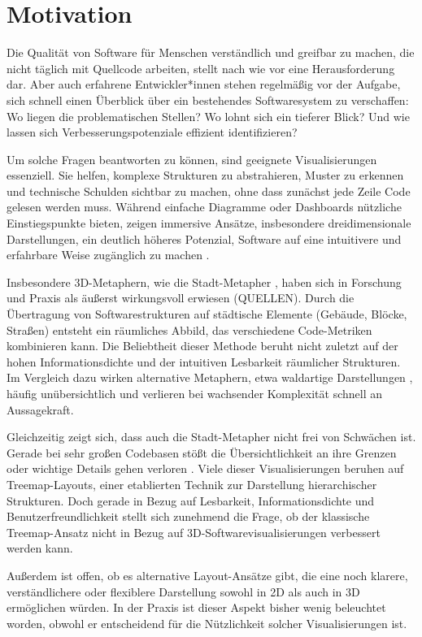 \chapter{Motivation} \label{sec:Motivation}
Die Qualität von Software für Menschen verständlich und greifbar zu machen, die nicht täglich mit Quellcode arbeiten, stellt nach wie vor eine Herausforderung dar. Aber auch erfahrene Entwickler*innen stehen regelmäßig vor der Aufgabe, sich schnell einen Überblick über ein bestehendes Softwaresystem zu verschaffen: Wo liegen die problematischen Stellen? Wo lohnt sich ein tieferer Blick? Und wie lassen sich Verbesserungspotenziale effizient identifizieren?

Um solche Fragen beantworten zu können, sind geeignete Visualisierungen essenziell. Sie helfen, komplexe Strukturen zu abstrahieren, Muster zu erkennen und technische Schulden sichtbar zu machen, ohne dass zunächst jede Zeile Code gelesen werden muss. Während einfache Diagramme oder Dashboards nützliche Einstiegspunkte bieten, zeigen immersive Ansätze, insbesondere dreidimensionale Darstellungen, ein deutlich höheres Potenzial, Software auf eine intuitivere und erfahrbare Weise zugänglich zu machen \cite{3dsoftwareMarcus,codeCity1,first_3D_vis,virtualButVisibleMunro}.

Insbesondere 3D-Metaphern, wie die Stadt-Metapher \cite{codeCity1}, haben sich in Forschung und Praxis als äußerst wirkungsvoll erwiesen (QUELLEN). Durch die Übertragung von Softwarestrukturen auf städtische Elemente (Gebäude, Blöcke, Straßen) entsteht ein räumliches Abbild, das verschiedene Code-Metriken kombinieren kann. Die Beliebtheit dieser Methode beruht nicht zuletzt auf der hohen Informationsdichte und der intuitiven Lesbarkeit räumlicher Strukturen. Im Vergleich dazu wirken alternative Metaphern, etwa waldartige Darstellungen \cite{softwareForest}, häufig unübersichtlich und verlieren bei wachsender Komplexität schnell an Aussagekraft.

Gleichzeitig zeigt sich, dass auch die Stadt-Metapher nicht frei von Schwächen ist. Gerade bei sehr großen Codebasen stößt die Übersichtlichkeit an ihre Grenzen oder wichtige Details gehen verloren \cite{lu2008cascaded}. Viele dieser Visualisierungen beruhen auf Treemap-Layouts, einer etablierten Technik zur Darstellung hierarchischer Strukturen. Doch gerade in Bezug auf Lesbarkeit, Informationsdichte und Benutzerfreundlichkeit stellt sich zunehmend die Frage, ob der klassische Treemap-Ansatz nicht in Bezug auf 3D-Softwarevisualisierungen verbessert werden kann.

Außerdem ist offen, ob es alternative Layout-Ansätze gibt, die eine noch klarere, verständlichere oder flexiblere Darstellung sowohl in 2D als auch in 3D ermöglichen würden. In der Praxis ist dieser Aspekt bisher wenig beleuchtet worden, obwohl er entscheidend für die Nützlichkeit solcher Visualisierungen ist.

